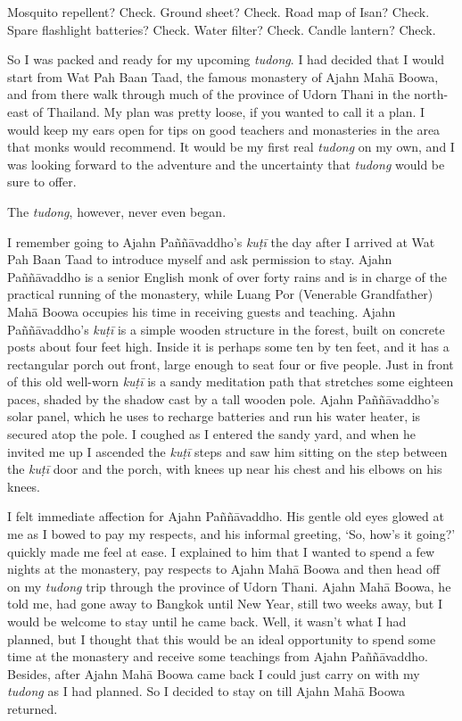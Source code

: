 
Mosquito repellent? Check. Ground sheet? Check. Road map of Isan? Check.
Spare flashlight batteries? Check. Water filter? Check. Candle lantern?
Check.

So I was packed and ready for my upcoming \emph{tudong}. I had decided
that I would start from Wat Pah Baan Taad, the famous monastery of Ajahn
Mahā Boowa, and from there walk through much of the province of Udorn
Thani in the north-east of Thailand. My plan was pretty loose, if you
wanted to call it a plan. I would keep my ears open for tips on good
teachers and monasteries in the area that monks would recommend. It
would be my first real \emph{tudong} on my own, and I was looking
forward to the adventure and the uncertainty that \emph{tudong} would be
sure to offer. 

The \emph{tudong}, however, never even began. 

I remember going to Ajahn Paññāvaddho's \emph{kuṭī} the day after I
arrived at Wat Pah Baan Taad to introduce myself and ask permission to
stay. Ajahn Paññāvaddho is a senior English monk of over forty rains and
is in charge of the practical running of the monastery, while Luang Por
(Venerable Grandfather) Mahā Boowa occupies his time in receiving guests
and teaching. Ajahn Paññāvaddho's \emph{kuṭī} is a simple wooden
structure in the forest, built on concrete posts about four feet high. 
Inside it is perhaps some ten by ten feet, and it has a rectangular
porch out front, large enough to seat four or five people. Just in front
of this old well-worn \emph{kuṭī} is a sandy meditation path that
stretches some eighteen paces, shaded by the shadow cast by a tall
wooden pole. Ajahn Paññāvaddho's solar panel, which he uses to recharge
batteries and run his water heater, is secured atop the pole. I coughed
as I entered the sandy yard, and when he invited me up I ascended the
\emph{kuṭī} steps and saw him sitting on the step between the
\emph{kuṭī} door and the porch, with knees up near his chest and his
elbows on his knees. 

I felt immediate affection for Ajahn Paññāvaddho. His gentle old eyes
glowed at me as I bowed to pay my respects, and his informal greeting, 
`So, how's it going?' quickly made me feel at ease. I explained to him
that I wanted to spend a few nights at the monastery, pay respects to
Ajahn Mahā Boowa and then head off on my \emph{tudong} trip through the
province of Udorn Thani. Ajahn Mahā Boowa, he told me, had gone away to
Bangkok until New Year, still two weeks away, but I would be welcome to
stay until he came back. Well, it wasn't what I had planned, but I
thought that this would be an ideal opportunity to spend some time at
the monastery and receive some teachings from Ajahn Paññāvaddho. 
Besides, after Ajahn Mahā Boowa came back I could just carry on with my
\emph{tudong} as I had planned. So I decided to stay on till Ajahn Mahā
Boowa returned. 

